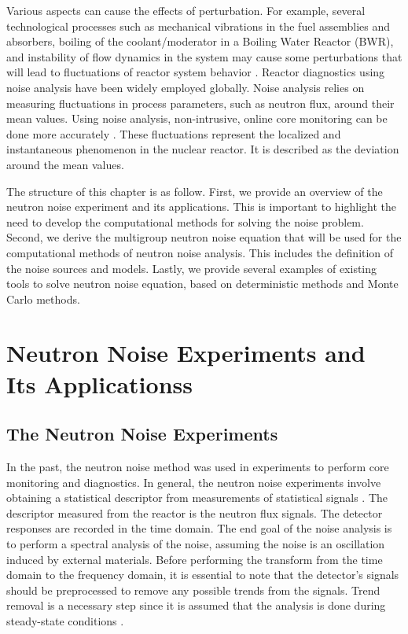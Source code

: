 Various aspects can cause the effects of perturbation. For example, several technological processes such as mechanical vibrations in the fuel assemblies and absorbers, boiling of the coolant/moderator in a Boiling Water Reactor (BWR), and instability of flow dynamics in the system may cause some perturbations that will lead to fluctuations of reactor system behavior \cite{thiePowerReactorNoise1981}. Reactor diagnostics using noise analysis have been widely employed globally. Noise analysis relies on measuring fluctuations in process parameters, such as neutron flux, around their mean values. Using noise analysis, non-intrusive, online core monitoring can be done more accurately \cite{demaziereDevelopmentNonintrusiveMethod2002}. These fluctuations represent the localized and instantaneous phenomenon in the nuclear reactor. It is described as the deviation around the mean values.

The structure of this chapter is as follow. First, we provide an overview of the neutron noise experiment and its applications. This is important to highlight the need to develop the computational methods for solving the noise problem. Second, we derive the multigroup neutron noise equation that will be used for the computational methods of neutron noise analysis. This includes the definition of the noise sources and models. Lastly, we provide several examples of existing tools to solve neutron noise equation, based on deterministic methods and Monte Carlo methods.
 
\section{Neutron Noise Experiments and Its Applicationss}

\subsection{The Neutron Noise Experiments}

In the past, the neutron noise method was used in experiments to perform core monitoring and diagnostics. In general, the neutron noise experiments involve obtaining a statistical descriptor from measurements of statistical signals \cite{thiePowerReactorNoise1981}. The descriptor measured from the reactor is the neutron flux signals. The detector responses are recorded in the time domain. The end goal of the noise analysis is to perform a spectral analysis of the noise, assuming the noise is an oscillation induced by external materials. Before performing the transform from the time domain to the frequency domain, it is essential to note that the detector’s signals should be preprocessed to remove any possible trends from the signals. Trend removal is a necessary step since it is assumed that the analysis is done during steady-state conditions \cite{mylonakisCORESIMSIMULATIONS2021}.

